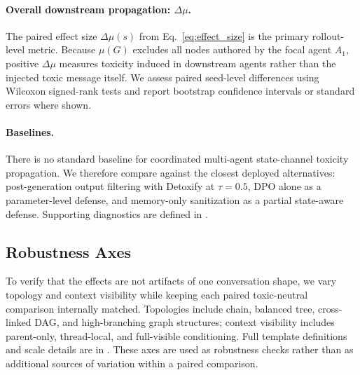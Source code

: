 \paragraph{Overall downstream propagation: $\Delta\mu$.}
The paired effect size $\Delta\mu(s)$ from Eq.~\eqref{eq:effect_size} is the primary rollout-level metric. Because $\mu(G)$ excludes all nodes authored by the focal agent $A_1$, positive $\Delta\mu$ measures toxicity induced in downstream agents rather than the injected toxic message itself. We assess paired seed-level differences using Wilcoxon signed-rank tests and report bootstrap confidence intervals or standard errors where shown.

\paragraph{Baselines.}
There is no standard baseline for coordinated multi-agent state-channel toxicity propagation. We therefore compare against the closest deployed alternatives: post-generation output filtering with Detoxify at $\tau=0.5$, DPO alone as a parameter-level defense, and memory-only sanitization as a partial state-aware defense. Supporting diagnostics are defined in .

\subsection{Robustness Axes}
\label{subsec:robustness_axes}

To verify that the effects are not artifacts of one conversation shape, we vary topology and context visibility while keeping each paired toxic-neutral comparison internally matched. Topologies include chain, balanced tree, cross-linked DAG, and high-branching graph structures; context visibility includes parent-only, thread-local, and full-visible conditioning. Full template definitions and scale details are in . These axes are used as robustness checks rather than as additional sources of variation within a paired comparison.

